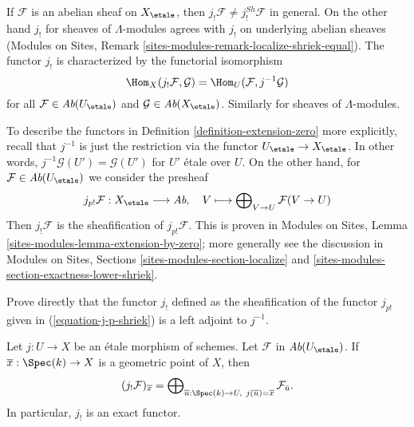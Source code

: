 \noindent
If $\mathcal{F}$ is an abelian sheaf on $X_\etale$, then
$j_!\mathcal{F} \not = j_!^{Sh}\mathcal{F}$ in general. On the other hand
$j_!$ for sheaves of $\Lambda$-modules agrees with $j_!$ on underlying
abelian sheaves
(Modules on Sites, Remark \ref{sites-modules-remark-localize-shriek-equal}).
The functor $j_!$ is characterized by the functorial isomorphism
$$
\Hom_X(j_!\mathcal{F}, \mathcal{G}) = \Hom_U(\mathcal{F}, j^{-1}\mathcal{G})
$$
for all $\mathcal{F} \in \textit{Ab}(U_\etale)$ and
$\mathcal{G} \in \textit{Ab}(X_\etale)$. Similarly for
sheaves of $\Lambda$-modules.

\medskip\noindent
To describe the functors in Definition \ref{definition-extension-zero}
more explicitly, recall that $j^{-1}$ is just the restriction
via the functor $U_\etale \to X_\etale$. In other words,
$j^{-1}\mathcal{G}(U') = \mathcal{G}(U')$ for $U'$ \'etale over $U$.
On the other hand, for $\mathcal{F} \in \textit{Ab}(U_\etale)$
we consider the presheaf
\begin{equation}
\label{equation-j-p-shriek}
j_{p!}\mathcal{F} : X_\etale \longrightarrow \textit{Ab},
\quad
V \longmapsto \bigoplus\nolimits_{V \to U} \mathcal{F}(V \to U)
\end{equation}
Then $j_!\mathcal{F}$ is the sheafification of $j_{p!}\mathcal{F}$.
This is proven in Modules on Sites, Lemma
\ref{sites-modules-lemma-extension-by-zero};
more generally see the discussion in
Modules on Sites, Sections \ref{sites-modules-section-localize} and
\ref{sites-modules-section-exactness-lower-shriek}.

\begin{exercise}
\label{exercise-jshriek-direct}
Prove directly that the functor $j_!$ defined as the sheafification of
the functor $j_{p!}$ given in
(\ref{equation-j-p-shriek}) is a left adjoint to $j^{-1}$.
\end{exercise}

\begin{proposition}
\label{proposition-describe-jshriek}
Let $j : U \to X$ be an \'etale morphism of schemes.
Let $\mathcal{F}$ in $\textit{Ab}(U_\etale)$.
If $\overline{x} : \Spec(k) \to X$ is a geometric point of $X$, then 
$$
(j_!\mathcal{F})_{\overline{x}} =
\bigoplus\nolimits_{\overline{u} : \Spec(k) \to U,\ j(\overline{u}) =
\overline{x}} \mathcal{F}_{\bar{u}}.
$$
In particular, $j_!$ is an exact functor.
\end{proposition}

